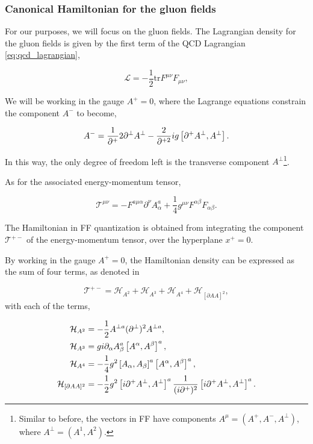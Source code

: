 \documentclass[11pt,a4paper,twoside,pdf]{article}
\numberwithin{equation}{section}
\begin{document}
\subsubsection{Canonical Hamiltonian for the gluon fields}

For our purposes, we will focus on the gluon fields. The Lagrangian density for 
the gluon fields is given by the first term of the QCD Lagrangian \eqref{eq:qcd_lagrangian},

\begin{equation}
    \mathcal{L} = -\frac{1}{2}\text{tr}F^{\mu\nu}F_{\mu\nu},
\end{equation}

We will be working in the gauge $A^+=0$, where the Lagrange equations constrain
the component $A^-$ to become,

\begin{equation}
    A^- = \frac{1}{\partial^+}2 \partial^\perp A^\perp - \frac{2}{\partial^{+2}} ig 
    \left[ \partial^+ A^\perp, A^\perp \right].
\end{equation}

In this way, the only degree of freedom left is the transverse component $A^\perp$\footnote{Similar to before, the vectors in FF have components
$A^\mu = (A^+, A^-, A^\perp)$, where $A^\perp = (A^1, A^2)$.}.

As for the associated energy-momentum tensor,

\begin{equation}
    \mathcal{T}^{\mu\nu} = -F^{a\mu\alpha}\partial^\nu A^a_\alpha + 
    \frac{1}{4}g^{\mu\nu}F^{\alpha\beta} F_{\alpha\beta}.
\end{equation}

The Hamiltonian in FF quantization is obtained from integrating the component
$\mathcal{T}^{+-}$ of the energy-momentum tensor, over the hyperplane $x^+=0$. 

By working in the gauge $A^+=0$, the Hamiltonian density can be expressed as the sum of 
four terms, as denoted in \cite{glazek_dynamics_2001}

\begin{equation}
    \mathcal{T}^{+-} = \mathcal{H}_{A^2} + \mathcal{H}_{A^3} +
    \mathcal{H}_{A^4} + \mathcal{H}_{[\partial AA]^2},
\end{equation}
with each of the terms, 

\begin{align}
    \mathcal{H}_{A^2} &= -\frac{1}{2} A^{\perp a} (\partial^\perp)^2 A^{\perp a}, \\
    \mathcal{H}_{A^3} &= g i \partial_\alpha A^a_\beta \left[ A^\alpha, A^\beta \right]^a, \\
    \mathcal{H}_{A^4} &= -\frac{1}{4} g^2 \left[ A_\alpha, A_\beta \right]^a
    \left[ A^\alpha, A^\beta \right]^a, \\
    \mathcal{H}_{[\partial AA]^2} &= -\frac{1}{2} g^2 \left[ i \partial^+ A^\perp,
    A^\perp \right]^a  \frac{1}{(i\partial^+)^2} \left[ i\partial^+ A^\perp, A^\perp \right]^a.
\end{align}
\end{document}

